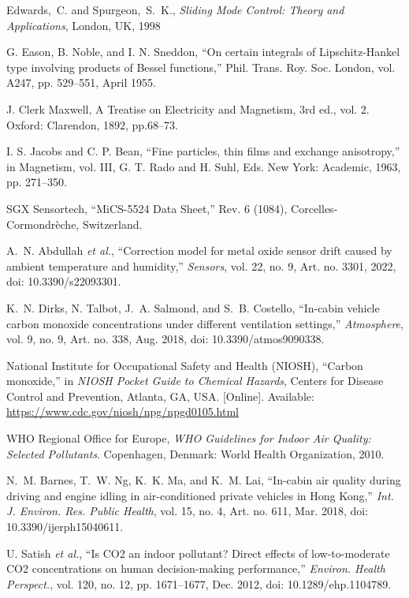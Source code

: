 Edwards,~C. and Spurgeon,~S.~K., \emph{Sliding Mode Control: Theory and Applications}, London, UK, 1998

G. Eason, B. Noble, and I. N. Sneddon, ``On certain integrals of Lipschitz-Hankel type involving products of Bessel functions,'' Phil. Trans. Roy. Soc. London, vol. A247, pp. 529--551, April 1955.

J. Clerk Maxwell, A Treatise on Electricity and Magnetism, 3rd ed., vol. 2. Oxford: Clarendon, 1892, pp.68--73.

I. S. Jacobs and C. P. Bean, ``Fine particles, thin films and exchange anisotropy,'' in Magnetism, vol. III, G. T. Rado and H. Suhl, Eds. New York: Academic, 1963, pp. 271--350.

SGX Sensortech, ``MiCS-5524 Data Sheet,'' Rev. 6 (1084), Corcelles-Cormondr\`{e}che, Switzerland.

A.~N. Abdullah \textit{et al.}, ``Correction model for metal oxide sensor drift caused by ambient temperature and humidity,'' \emph{Sensors}, vol. 22, no. 9, Art. no. 3301, 2022, doi: 10.3390/s22093301.

K.~N. Dirks, N. Talbot, J.~A. Salmond, and S.~B. Costello, ``In-cabin vehicle carbon monoxide concentrations under different ventilation settings,'' \emph{Atmosphere}, vol. 9, no. 9, Art. no. 338, Aug. 2018, doi: 10.3390/atmos9090338.

National Institute for Occupational Safety and Health (NIOSH), ``Carbon monoxide,'' in \emph{NIOSH Pocket Guide to Chemical Hazards}, Centers for Disease Control and Prevention, Atlanta, GA, USA. [Online]. Available: \url{https://www.cdc.gov/niosh/npg/npgd0105.html}

WHO Regional Office for Europe, \emph{WHO Guidelines for Indoor Air Quality: Selected Pollutants}. Copenhagen, Denmark: World Health Organization, 2010.

N.~M. Barnes, T.~W. Ng, K.~K. Ma, and K.~M. Lai, ``In-cabin air quality during driving and engine idling in air-conditioned private vehicles in Hong Kong,'' \emph{Int. J. Environ. Res. Public Health}, vol. 15, no. 4, Art. no. 611, Mar. 2018, doi: 10.3390/ijerph15040611.

U. Satish \emph{et al.}, ``Is CO2 an indoor pollutant? Direct effects of low-to-moderate CO2 concentrations on human decision-making performance,'' \emph{Environ. Health Perspect.}, vol. 120, no. 12, pp. 1671--1677, Dec. 2012, doi: 10.1289/ehp.1104789.

